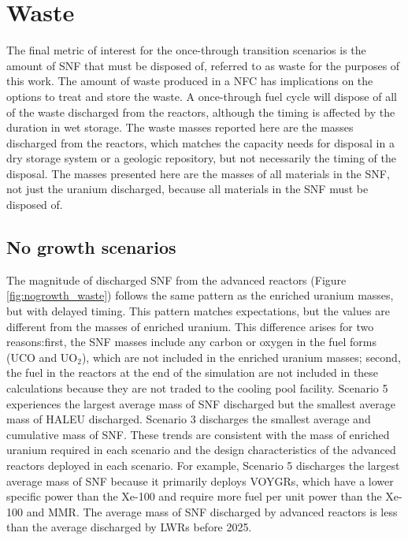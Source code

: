 \section{Waste}
The final metric of interest for the once-through transition scenarios is 
the amount of \gls{SNF} that must be disposed of, referred to as waste 
for the purposes of this work. 
The amount of waste produced in a \gls{NFC} has implications on the options 
to treat and store the waste. A once-through fuel cycle will dispose of 
all of the 
waste discharged from the reactors, although 
the timing is affected by the duration in wet storage. The waste masses 
reported here are the masses discharged from the reactors, which 
matches the capacity needs for disposal in a dry storage system or a 
geologic repository, but not necessarily the timing of the disposal.
The masses 
presented here are the masses of all materials in the \gls{SNF}, not just 
the uranium discharged, because all materials in the \gls{SNF} must be 
disposed of. 

\subsection{No growth scenarios}
The magnitude of discharged \gls{SNF} from the advanced reactors 
(Figure \ref{fig:nogrowth_waste}) follows the same pattern as the enriched 
uranium masses, but with delayed timing. This pattern matches expectations, 
but the values are different from the masses of enriched uranium. 
This difference arises for two reasons:first, the 
\gls{SNF} masses include any carbon or oxygen in the fuel forms (UCO and 
UO$_2$), which 
are not included in the enriched uranium masses; second, the 
fuel in the reactors at the end of the simulation are not included in these 
calculations because they are not traded to the cooling pool facility.
Scenario 5 experiences the largest average mass of \gls{SNF} 
discharged but the smallest average mass of \gls{HALEU} discharged. 
Scenario 3 discharges the smallest average and cumulative mass of \gls{SNF}.
These trends are consistent with the mass of enriched uranium required 
in each scenario and the design characteristics of the advanced 
reactors deployed in each scenario. For example, Scenario 5 discharges the 
largest average mass of \gls{SNF} because it primarily deploys VOYGRs, which 
have a lower specific power than the Xe-100 and require more fuel per unit 
power than the Xe-100 and \gls{MMR}. 
The average mass of \gls{SNF} discharged by advanced reactors is less than 
the average discharged by \glspl{LWR} before 2025. 

